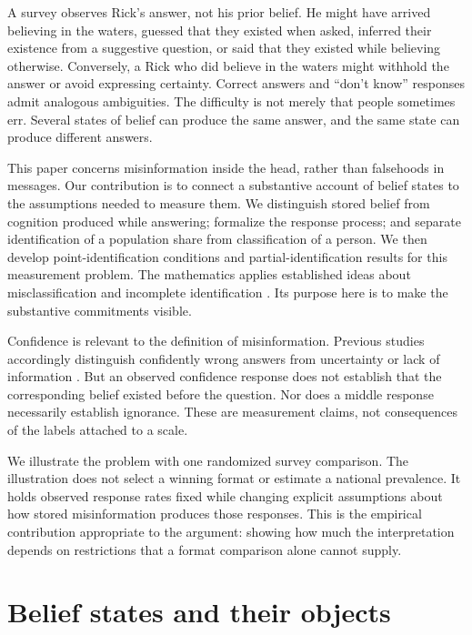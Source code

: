 \documentclass[11pt]{article}
\begin{document}
A survey observes Rick's answer, not his prior belief. He might have arrived believing in the waters, guessed that they existed when asked, inferred their existence from a suggestive question, or said that they existed while believing otherwise. Conversely, a Rick who did believe in the waters might withhold the answer or avoid expressing certainty. Correct answers and ``don't know'' responses admit analogous ambiguities. The difficulty is not merely that people sometimes err. Several states of belief can produce the same answer, and the same state can produce different answers.

This paper concerns misinformation inside the head, rather than falsehoods in messages. Our contribution is to connect a substantive account of belief states to the assumptions needed to measure them. We distinguish stored belief from cognition produced while answering; formalize the response process; and separate identification of a population share from classification of a person. We then develop point-identification conditions and partial-identification results for this measurement problem. The mathematics applies established ideas about misclassification and incomplete identification \citep{molinari2008,tamer2010}. Its purpose here is to make the substantive commitments visible.

Confidence is relevant to the definition of misinformation. Previous studies accordingly distinguish confidently wrong answers from uncertainty or lack of information \citep{kuklinski2000,pasek2015,li2020}. But an observed confidence response does not establish that the corresponding belief existed before the question. Nor does a middle response necessarily establish ignorance. These are measurement claims, not consequences of the labels attached to a scale.

We illustrate the problem with one randomized survey comparison. The illustration does not select a winning format or estimate a national prevalence. It holds observed response rates fixed while changing explicit assumptions about how stored misinformation produces those responses. This is the empirical contribution appropriate to the argument: showing how much the interpretation depends on restrictions that a format comparison alone cannot supply.

\section{Belief states and their objects}
\end{document}

